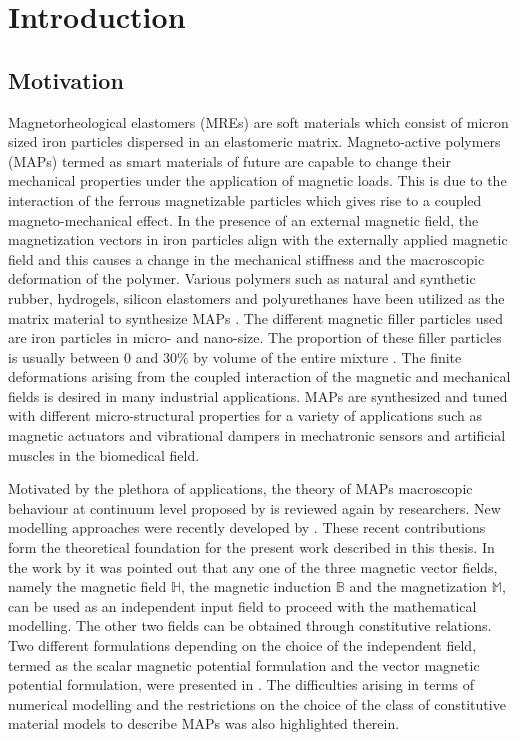 \chapter{Introduction}
\label{chap:1}

\section{Motivation}
Magnetorheological elastomers (MREs) are soft materials which consist of micron sized iron particles dispersed in an elastomeric matrix. Magneto-active polymers (MAPs) termed as smart materials of future are capable to change their mechanical properties under the application of magnetic loads. This is due to the interaction of the ferrous magnetizable particles which gives rise to a coupled magneto-mechanical effect. In the presence of an external magnetic field, the magnetization vectors in iron particles align with the externally applied magnetic field and this causes a change in the mechanical stiffness and the macroscopic deformation of the polymer. Various polymers such as natural and synthetic rubber, hydrogels, silicon elastomers and polyurethanes have been utilized as the matrix material to synthesize MAPs \cite{Hana}. The different magnetic filler particles used are iron particles in micro- and nano-size. The proportion of these filler particles is usually between 0 and 30\% by volume of the entire mixture \cite{Saxena2015}. The finite deformations arising from the coupled interaction of the magnetic and mechanical fields is desired in many industrial applications. MAPs are synthesized and tuned with different micro-structural properties for a variety of applications such as magnetic actuators and vibrational dampers in mechatronic sensors and artificial muscles in the biomedical field. \par 
Motivated by the plethora of applications, the theory of MAPs macroscopic behaviour at continuum level proposed by \cite{tiersten1964coupled, brown1966magnetoelastic} is reviewed again by researchers. New modelling approaches were recently developed by \cite{kovetz2000electromagnetic, KANKANALA, dorfmann2004, dorfmann2005, ogden2011mechanics, Dorfmann2014}. These recent contributions form the theoretical foundation for the present work described in this thesis. In the work by \cite{dorfmann2004, dorfmann2005} it was pointed out that any one of the three magnetic vector fields, namely the magnetic field $\mathbb{H}$, the magnetic induction $\mathbb{B}$ and the magnetization $\mathbb{M}$, can be used as an independent input field to proceed with the mathematical modelling. The other two fields can be obtained through constitutive relations. Two different formulations depending on the choice of the independent field, termed as the scalar magnetic potential formulation and the vector magnetic potential formulation, were presented in \cite{dorfmann2004, dorfmann2005}. The difficulties arising in terms of numerical modelling and the restrictions on the choice of the class of constitutive material models to describe MAPs was also highlighted therein. \par
